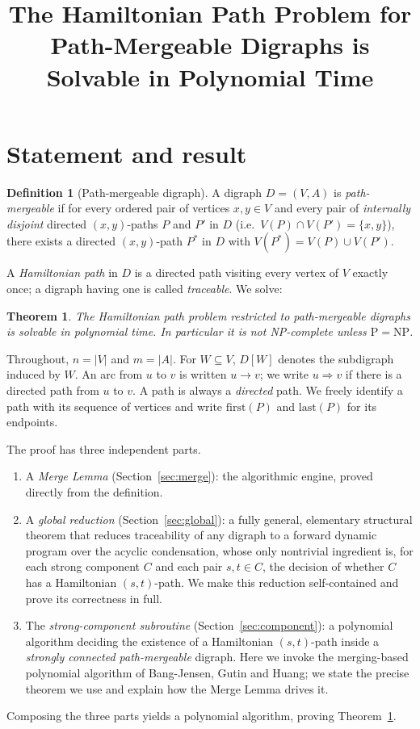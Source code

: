 \documentclass[12pt]{article}
\newtheorem{theorem}{Theorem}
\theoremstyle{definition}
\newtheorem{definition}{Definition}
\newcommand{\Vv}{V}
\newcommand{\Aa}{A}
\begin{document}
\title{The Hamiltonian Path Problem for Path-Mergeable Digraphs is Solvable in Polynomial Time}
\author{}
\date{}
\maketitle

\section{Statement and result}

\begin{definition}[Path-mergeable digraph]
A digraph $D=(\Vv,\Aa)$ is \emph{path-mergeable} if for every ordered pair of
vertices $x,y\in \Vv$ and every pair of \emph{internally disjoint} directed
$(x,y)$-paths $P$ and $P'$ in $D$ (i.e.\ $V(P)\cap V(P')=\{x,y\}$), there exists a
directed $(x,y)$-path $P^{*}$ in $D$ with $V(P^{*})=V(P)\cup V(P')$.
\end{definition}

A \emph{Hamiltonian path} in $D$ is a directed path visiting every vertex of $\Vv$
exactly once; a digraph having one is called \emph{traceable}. We solve:

\begin{theorem}\label{thm:main}
The Hamiltonian path problem restricted to path-mergeable digraphs is solvable in
polynomial time. In particular it is \emph{not} NP-complete unless $\mathrm{P}=\mathrm{NP}$.
\end{theorem}

Throughout, $n=|\Vv|$ and $m=|\Aa|$. For $W\subseteq \Vv$, $D[W]$ denotes the
subdigraph induced by $W$. An arc from $u$ to $v$ is written $u\to v$; we write
$u\Rightarrow v$ if there is a directed path from $u$ to $v$. A path is always a
\emph{directed} path. We freely identify a path with its sequence of vertices and
write $\mathrm{first}(P)$ and $\mathrm{last}(P)$ for its endpoints.

The proof has three independent parts.
\begin{enumerate}
\item A \emph{Merge Lemma} (Section~\ref{sec:merge}): the algorithmic engine,
proved directly from the definition.
\item A \emph{global reduction} (Section~\ref{sec:global}): a fully general,
elementary structural theorem that reduces traceability of any digraph to a
forward dynamic program over the acyclic condensation, whose only nontrivial
ingredient is, for each strong component $C$ and each pair $s,t\in C$, the
decision of whether $C$ has a Hamiltonian $(s,t)$-path. We make this reduction
self-contained and prove its correctness in full.
\item The \emph{strong-component subroutine} (Section~\ref{sec:component}): a
polynomial algorithm deciding the existence of a Hamiltonian $(s,t)$-path inside a
\emph{strongly connected path-mergeable} digraph. Here we invoke the
merging-based polynomial algorithm of Bang-Jensen, Gutin and Huang; we state the
precise theorem we use and explain how the Merge Lemma drives it.
\end{enumerate}
Composing the three parts yields a polynomial algorithm, proving
Theorem~\ref{thm:main}.
\end{document}
